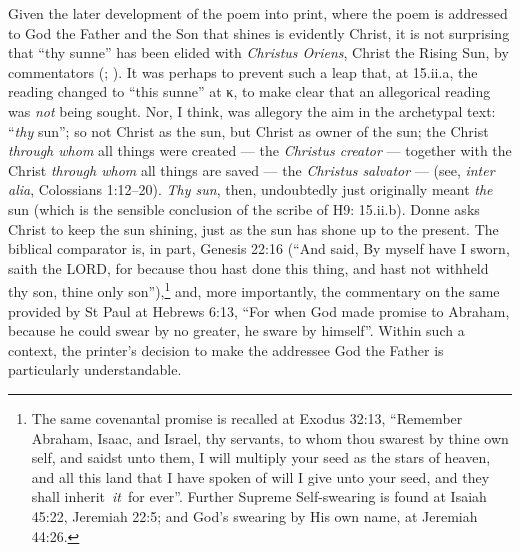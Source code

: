 \begin{paper}
Given the later development of the poem into print, where the poem is
addressed to God the Father and the Son that shines is evidently Christ,
it is not surprising that ``thy sunne'' has been elided with
\emph{Christus Oriens}, Christ the Rising Sun, by commentators (\citealt[22--23]{pebworth_editor_1987}; \citealt{robbins_complete_2013}). It was perhaps to prevent such a leap
that, at 15.ii.a, the reading changed to ``this sunne'' at κ, to make
clear that an allegorical reading was \emph{not} being sought. Nor, I
think, was allegory the aim in the archetypal text: ``\emph{thy} sun'';
so not Christ as the sun, but Christ as owner of the sun; the Christ
\emph{through whom} all things were created --- the \emph{Christus
creator} --- together with the Christ \emph{through whom} all things are
saved --- the \emph{Christus salvator} --- (see, \emph{inter alia},
Colossians 1:12--20). \emph{Thy sun}, then,
undoubtedly just originally meant \emph{the} sun (which is the sensible
conclusion of the scribe of H9: 15.ii.b). Donne asks Christ to keep the
sun shining, just as the sun has shone up to the present. The biblical
comparator is, in part, Genesis 22:16 (``And said, By myself have I
sworn, saith the LORD, for because thou hast done this thing, and hast
not withheld thy son, thine only son''),\footnote{The same covenantal
  promise is recalled at Exodus 32:13, ``Remember Abraham, Isaac, and
  Israel, thy servants, to whom thou swarest by thine own self, and
  saidst unto them, I will multiply your seed as the stars of heaven,
  and all this land that I have spoken of will I give unto your seed,
  and they shall inherit~\emph{it}~for ever''. Further Supreme
  Self-swearing is found at Isaiah 45:22, Jeremiah 22:5; and God's
  swearing by His own name, at Jeremiah 44:26.} and, more importantly,
the commentary on the same provided by St Paul at Hebrews 6:13, ``For
when God made promise to Abraham, because he could swear by no greater,
he sware by himself''. Within such a context, the printer's decision to
make the addressee God the Father is particularly understandable.


\end{paper}
